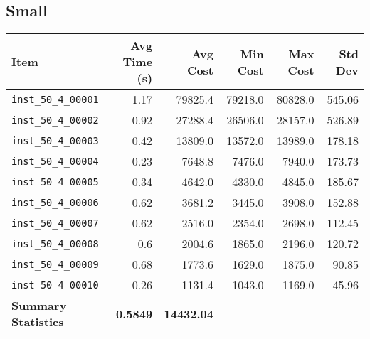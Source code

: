 \documentclass{article}
\begin{document}
\subsection*{Small}
\begin{table}[H]
	\centering
    \hspace*{-2cm}
	\begin{tabular}{lrrrrr}
		\toprule
		\textbf{Item} & \textbf{Avg Time (s)} & \textbf{Avg Cost} & \textbf{Min Cost} & \textbf{Max Cost} & \textbf{Std Dev} \\
		\midrule
		\texttt{inst\_50\_4\_00001} & 1.17 & 79825.4 & 79218.0 & 80828.0 & 545.06 \\ 
		\texttt{inst\_50\_4\_00002} & 0.92 & 27288.4 & 26506.0 & 28157.0 & 526.89 \\ 
		\texttt{inst\_50\_4\_00003} & 0.42 & 13809.0 & 13572.0 & 13989.0 & 178.18 \\ 
		\texttt{inst\_50\_4\_00004} & 0.23 & 7648.8 & 7476.0 & 7940.0 & 173.73 \\ 
		\texttt{inst\_50\_4\_00005} & 0.34 & 4642.0 & 4330.0 & 4845.0 & 185.67 \\ 
		\texttt{inst\_50\_4\_00006} & 0.62 & 3681.2 & 3445.0 & 3908.0 & 152.88 \\ 
		\texttt{inst\_50\_4\_00007} & 0.62 & 2516.0 & 2354.0 & 2698.0 & 112.45 \\ 
		\texttt{inst\_50\_4\_00008} & 0.6 & 2004.6 & 1865.0 & 2196.0 & 120.72 \\ 
		\texttt{inst\_50\_4\_00009} & 0.68 & 1773.6 & 1629.0 & 1875.0 & 90.85 \\ 
		\texttt{inst\_50\_4\_00010} & 0.26 & 1131.4 & 1043.0 & 1169.0 & 45.96 \\
		\midrule
		\textbf{Summary Statistics} & \textbf{0.5849} & \textbf{14432.04} & - & - & - \\
		\bottomrule
	\end{tabular}
	\label{tab:performance_metrics_small_grasp}
\end{table}
\end{document}
